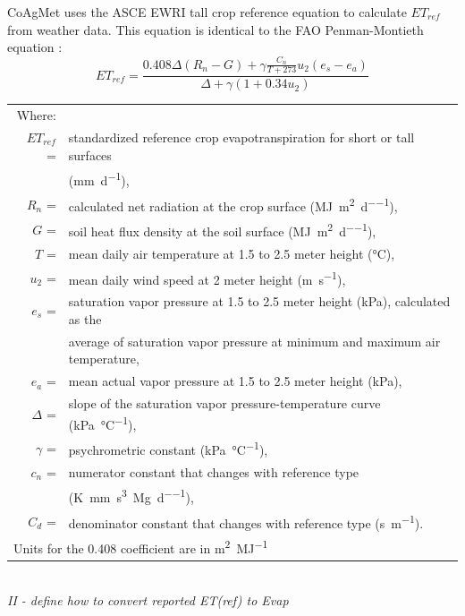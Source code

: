 \begin{linenumbers}
CoAgMet uses the ASCE EWRI tall crop reference equation to calculate $ET_{ref}$ from weather data.  This equation is identical to the FAO Penman-Montieth equation \parencite{walter2000asce,FAO56}:
\begin{equation}
\label{eq:ET}
	ET_{ref}=\frac{0.408\Delta(R_n-G)+\gamma\frac{C_n}{T+273}u_2(e_s-e_a)}{\Delta+\gamma(1+0.34u_2)}
\end{equation}
\begin{tabular}{rl}
Where: &\\
$ET_{ref}$ =&standardized reference crop evapotranspiration for short or tall surfaces \\
&(\si{\milli\meter\per\day}),\\
$R_n$ =&calculated net radiation at the crop surface (\si{\mega\joule\per\meter\squared\per\day}),\\
$G$ =&soil heat flux density at the soil surface (\si{\mega\joule\per\meter\squared\per\day}),\\
$T$ =&mean daily air temperature at 1.5 to 2.5 meter height (\si{\degreeCelsius}),\\
$u_2$ =&mean daily wind speed at 2 meter height (\si{\meter\per\second}),\\
$e_s$ =&saturation vapor pressure at 1.5 to 2.5 meter height (\si{\kilo\pascal}), calculated as the \\
&average of saturation vapor pressure at minimum and maximum air temperature,\\
$e_a$ =&mean actual vapor pressure at 1.5 to 2.5 meter height (\si{\kilo\pascal}),\\
$\Delta$ =&slope of the saturation vapor pressure-temperature curve (\si{\kilo\pascal\per\degreeCelsius}),\\
$\gamma$ =&psychrometric constant (\si{\kilo\pascal\per\degreeCelsius}),\\
$c_n$ =&numerator constant that changes with reference type \\
&(\si{\kelvin\milli\meter\second\cubed\per\mega\gram\per\day}),\\
$C_d$ =&denominator constant that changes with reference type (\si{\second\per\meter}).\\
\multicolumn{2}{l}{Units for the 0.408 coefficient are in \si{\meter\squared\per\mega\joule}}\\
\end{tabular}\\

\emph{II - define how to convert reported ET(ref) to Evap}\\


\end{linenumbers}

